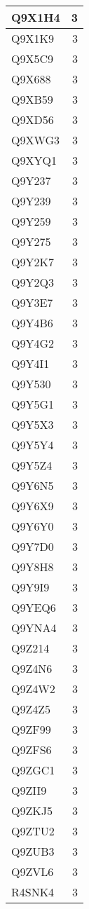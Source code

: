 \documentclass[
]{book}
\theoremstyle{definition}
\theoremstyle{definition}
\theoremstyle{definition}
\theoremstyle{definition}
\theoremstyle{remark}
\begin{document}
\begin{table}
\begin{tabular}{l|r}
\hline
Q9X1H4 & 3\\
\hline
Q9X1K9 & 3\\
\hline
Q9X5C9 & 3\\
\hline
Q9X688 & 3\\
\hline
Q9XB59 & 3\\
\hline
Q9XD56 & 3\\
\hline
Q9XWG3 & 3\\
\hline
Q9XYQ1 & 3\\
\hline
Q9Y237 & 3\\
\hline
Q9Y239 & 3\\
\hline
Q9Y259 & 3\\
\hline
Q9Y275 & 3\\
\hline
Q9Y2K7 & 3\\
\hline
Q9Y2Q3 & 3\\
\hline
Q9Y3E7 & 3\\
\hline
Q9Y4B6 & 3\\
\hline
Q9Y4G2 & 3\\
\hline
Q9Y4I1 & 3\\
\hline
Q9Y530 & 3\\
\hline
Q9Y5G1 & 3\\
\hline
Q9Y5X3 & 3\\
\hline
Q9Y5Y4 & 3\\
\hline
Q9Y5Z4 & 3\\
\hline
Q9Y6N5 & 3\\
\hline
Q9Y6X9 & 3\\
\hline
Q9Y6Y0 & 3\\
\hline
Q9Y7D0 & 3\\
\hline
Q9Y8H8 & 3\\
\hline
Q9Y9I9 & 3\\
\hline
Q9YEQ6 & 3\\
\hline
Q9YNA4 & 3\\
\hline
Q9Z214 & 3\\
\hline
Q9Z4N6 & 3\\
\hline
Q9Z4W2 & 3\\
\hline
Q9Z4Z5 & 3\\
\hline
Q9ZF99 & 3\\
\hline
Q9ZFS6 & 3\\
\hline
Q9ZGC1 & 3\\
\hline
Q9ZII9 & 3\\
\hline
Q9ZKJ5 & 3\\
\hline
Q9ZTU2 & 3\\
\hline
Q9ZUB3 & 3\\
\hline
Q9ZVL6 & 3\\
\hline
R4SNK4 & 3\\

\end{tabular}
\end{table}
\end{document}
